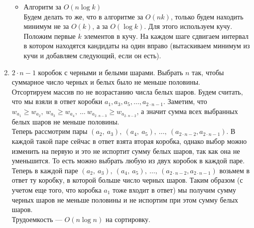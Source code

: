 \documentclass[10pt]{article}
\begin{document}
\begin{enumerate}
\begin{itemize}
		\item Алгоритм за $O(n \log k)$\\
		Будем делать то же, что в алгоритме за $O(nk)$, только будем находить минимум не за $O(k)$, а за $O(\log k)$. Для этого используем кучу. Положим первые $k$ элементов в кучу. На каждом шаге сдвигаем интервал в котором находятся кандидаты на один вправо (вытаскиваем минимум из кучи и добавляем следующий, если он есть).
	\end{itemize}
	
	\item $2 \cdot n -1 $ коробок с черными и белыми шарами. Выбрать $n$ так, чтобы суммарное число черных и белых было не меньше половины. \\
	Отсортируем массив по не возрастанию числа белых шаров. Будем считать, что мы взяли в ответ коробки $a_1, a_3, a_5, \ldots, a_{2\cdot n -1 }$. Заметим, что $w_{a_1} \ge w_{a_2},\ w_{a_3} \ge w_{a_4},\ \ldots\  w_{a_{2\cdot n-3}} \ge w_{a_{2\cdot n-2}}$, а значит сумма всех выбранных белых шаров не меньше половины.\\
	Теперь рассмотрим пары $(a_2,\ a_3),\ (a_4,\ a_5),\ \ldots,\ (a_{2\cdot n -2}, a_{2\cdot n -1})$. В каждой такой паре сейчас в ответ взята вторая коробка, однако выбор можно изменить на первую и это не испортит сумму белых шаров, так как она не уменьшится. То есть можно выбрать любую из двух коробок в каждой паре.\\
	Теперь в каждой паре $(a_2,\ a_3),\ (a_4,\ a_5),\ \ldots,\ (a_{2\cdot n -2}, a_{2\cdot n -1})$ возьмем в ответ ту коробку, в которой больше число черных шаров. Таким образом (с учетом еще того, что коробка $a_1$ тоже входит в ответ) мы получим сумму черных шаров не меньше половины и не испортим при этом сумму белых шаров.\\
	Трудоемкость --- $O(n \log n)$ на сортировку.
	

\end{enumerate}
\end{document}
